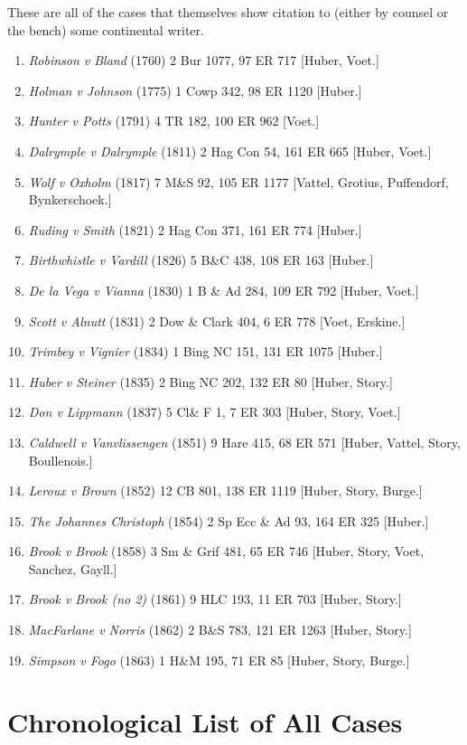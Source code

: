 \documentclass[twoside]{article}
\begin{document}
These are all of the cases that themselves show citation to (either by counsel or the bench) some continental writer.
\\ 
\begin{enumerate}
\item{\textit{Robinson v Bland} (1760) 2 Bur 1077, 97 ER 717 [Huber, Voet.]}
\item{\textit{Holman v Johnson} (1775) 1 Cowp 342, 98 ER 1120 [Huber.]}
\item{\textit{Hunter v Potts} (1791) 4 TR 182, 100 ER 962 [Voet.]}
\item{\textit{Dalrymple v Dalrymple} (1811) 2 Hag Con 54, 161 ER 665 [Huber, Voet.]}
\item{\textit{Wolf v Oxholm} (1817) 7 M\&S 92, 105 ER 1177 [Vattel, Grotius, Puffendorf, Bynkerschoek.]}
\item{\textit{Ruding v Smith} (1821) 2 Hag Con 371, 161 ER 774 [Huber.]}
\item{\textit{Birthwhistle v Vardill} (1826) 5 B\&C 438, 108 ER 163 [Huber.]}
\item{\textit{De la Vega v Vianna} (1830) 1 B \& Ad 284, 109 ER 792 [Huber, Voet.]}
\item{\textit{Scott v Alnutt} (1831) 2 Dow \& Clark 404, 6 ER 778 [Voet, Erskine.]}
\item{\textit{Trimbey v Vignier} (1834) 1 Bing NC 151, 131 ER 1075 [Huber.]}
\item{\textit{Huber v Steiner} (1835) 2 Bing NC 202, 132 ER 80 [Huber, Story.]}
\item{\textit{Don v Lippmann} (1837) 5 Cl\& F 1, 7 ER 303 [Huber, Story, Voet.]}
\item{\textit{Caldwell v Vanvlissengen} (1851) 9 Hare 415, 68 ER 571 [Huber, Vattel, Story, Boullenois.]}
\item{\textit{Leroux v Brown} (1852) 12 CB 801, 138 ER 1119 [Huber, Story, Burge.]}
\item{\textit{The Johannes Christoph} (1854) 2 Sp Ecc \& Ad 93, 164 ER 325 [Huber.]}
\item{\textit{Brook v Brook} (1858) 3 Sm \& Grif 481, 65 ER 746 [Huber, Story, Voet, Sanchez, Gayll.]}
\item{\textit{Brook v Brook (no 2)} (1861) 9 HLC 193, 11 ER 703 [Huber, Story.]}
\item{\textit{MacFarlane v Norris} (1862) 2 B\&S 783, 121 ER 1263 [Huber, Story.]}
\item{\textit{Simpson v Fogo} (1863) 1 H\&M 195, 71 ER 85 [Huber, Story, Burge.]}
\end{enumerate}
\newpage\section{Chronological List of All Cases}
\end{document}
